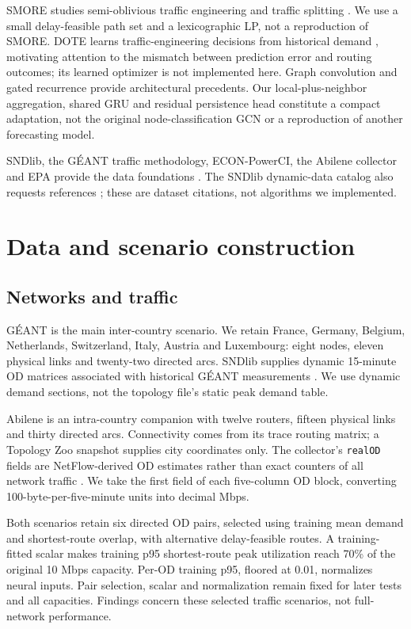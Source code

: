 \documentclass[conference,letterpaper]{IEEEtran}
\begin{document}
SMORE studies semi-oblivious traffic engineering and traffic splitting \cite{smore2018}. We use a small delay-feasible path set and a lexicographic LP, not a reproduction of SMORE. DOTE learns traffic-engineering decisions from historical demand \cite{dote2023}, motivating attention to the mismatch between prediction error and routing outcomes; its learned optimizer is not implemented here. Graph convolution \cite{kipf2017} and gated recurrence \cite{cho2014} provide architectural precedents. Our local-plus-neighbor aggregation, shared GRU and residual persistence head constitute a compact adaptation, not the original node-classification GCN or a reproduction of another forecasting model.

SNDlib, the GÉANT traffic methodology, ECON-PowerCI, the Abilene collector and EPA provide the data foundations \cite{sndlib2010,uhlig2006,econ2025,econdata2025,abilenedata,epaegrid}. The SNDlib dynamic-data catalog also requests references \cite{dynamic2011,robust2010}; these are dataset citations, not algorithms we implemented.

\section{Data and scenario construction}

\subsection{Networks and traffic}

GÉANT is the main inter-country scenario. We retain France, Germany, Belgium, Netherlands, Switzerland, Italy, Austria and Luxembourg: eight nodes, eleven physical links and twenty-two directed arcs. SNDlib supplies dynamic 15-minute OD matrices associated with historical GÉANT measurements \cite{sndlib2010,uhlig2006}. We use dynamic demand sections, not the topology file's static peak demand table.

Abilene is an intra-country companion with twelve routers, fifteen physical links and thirty directed arcs. Connectivity comes from its trace routing matrix; a Topology Zoo snapshot supplies city coordinates only. The collector's \texttt{realOD} fields are NetFlow-derived OD estimates rather than exact counters of all network traffic \cite{abilenedata}. We take the first field of each five-column OD block, converting 100-byte-per-five-minute units into decimal Mbps.

Both scenarios retain six directed OD pairs, selected using training mean demand and shortest-route overlap, with alternative delay-feasible routes. A training-fitted scalar makes training p95 shortest-route peak utilization reach 70\% of the original 10 Mbps capacity. Per-OD training p95, floored at 0.01, normalizes neural inputs. Pair selection, scalar and normalization remain fixed for later tests and all capacities. Findings concern these selected traffic scenarios, not full-network performance.
\end{document}
